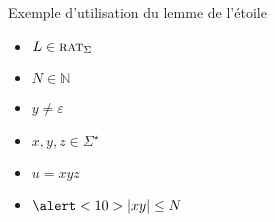 \begin{frame}{Exemple d'utilisation du lemme de l'étoile}
{    \vspace{-1mm}
    \begin{minipage}{2.5cm}
      \begin{itemize}
      \item<2-> $L \in \textsc{rat}_\Sigma$
      \item<4-> $N \in \mathbb{N}$
      \item<7-> \alert<9>{$y\neq \varepsilon$}
      \end{itemize}
    \end{minipage}
    \begin{minipage}{2.5cm}
      \begin{itemize}
      \item<7-> $x, y, z\in \Sigma^\star$
      \item<7-> $u = x y z$
      \item<7-> $\alert<10>{|xy| \le N}$
      \end{itemize}
    \end{minipage}
  }


\end{frame}
